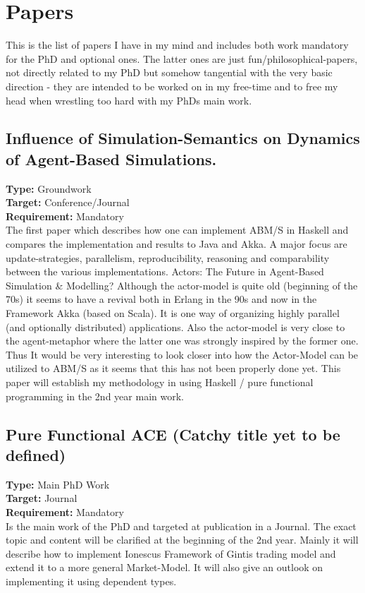 \section{Papers}
This is the list of papers I have in my mind and includes both work mandatory for the PhD and optional ones. The latter ones are just fun/philosophical-papers, not directly related to my PhD but somehow tangential with the very basic direction - they are intended to be worked on in my free-time and to free my head when wrestling too hard with my PhDs main work.

\subsection{Influence of Simulation-Semantics on Dynamics of Agent-Based Simulations.}
\textbf{Type:} Groundwork \\
\textbf{Target:} Conference/Journal \\
\textbf{Requirement:} Mandatory \\

The first paper which describes how one can implement ABM/S in Haskell and compares the implementation and results to Java and Akka. A major focus are update-strategies, parallelism, reproducibility, reasoning and comparability between the various implementations. Actors: The Future in Agent-Based Simulation \& Modelling? Although the actor-model is quite old (beginning of the 70s) it seems to have a revival both in Erlang in the 90s and now in the Framework Akka (based on Scala). It is one way of organizing highly parallel (and optionally distributed) applications. Also the actor-model is very close to the agent-metaphor where the latter one was strongly inspired by the former one. Thus It would be very interesting to look closer into how the Actor-Model can be utilized to ABM/S as it seems that this has not been properly done yet. This paper will establish my methodology in using Haskell / pure functional programming in the 2nd year main work.

\subsection{Pure Functional ACE (Catchy title yet to be defined)}
\textbf{Type:} Main PhD Work \\
\textbf{Target:} Journal \\
\textbf{Requirement:} Mandatory \\

Is the main work of the PhD and targeted at publication in a Journal. The exact topic and content will be clarified at the beginning of the 2nd year. Mainly it will describe how to implement Ionescus Framework of Gintis trading model and extend it to a more general Market-Model. It will also give an outlook on implementing it using dependent types.

